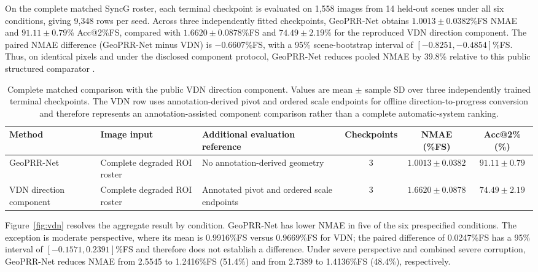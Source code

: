 \documentclass[electronics,article,submit,oneauthor]{Definitions/mdpi}
\newcommand{\modelname}{GeoPRR-Net\xspace}
\begin{document}
On the complete matched SyncG roster, each terminal checkpoint is evaluated on 1,558 images from 14 held-out scenes under all six conditions, giving 9,348 rows per seed. Across three independently fitted checkpoints, \modelname obtains $1.0013\pm0.0382$\%FS NMAE and $91.11\pm0.79$\% Acc@2\%FS, compared with $1.6620\pm0.0878$\%FS and $74.49\pm2.19$\% for the reproduced VDN direction component. The paired NMAE difference (\modelname minus VDN) is $-0.6607$\%FS, with a 95\% scene-bootstrap interval of $[-0.8251,-0.4854]$\%FS. Thus, on identical pixels and under the disclosed component protocol, \modelname reduces pooled NMAE by 39.8\% relative to this public structured comparator \cite{dong2021vdn}.

\begin{table}[H]
\caption{Complete matched comparison with the public VDN direction component. Values are mean $\pm$ sample SD over three independently trained terminal checkpoints. The VDN row uses annotation-derived pivot and ordered scale endpoints for offline direction-to-progress conversion and therefore represents an annotation-assisted component comparison rather than a complete automatic-system ranking.}
\label{tab:vdn}
\centering
\small
\begin{tabularx}{\textwidth}{@{}>{\raggedright\arraybackslash}p{}>{\raggedright\arraybackslash}p{}>{\raggedright\arraybackslash}Xccc@{}}
\toprule
\textbf{Method} & \textbf{Image input} & \textbf{Additional evaluation reference} & \textbf{Checkpoints} & \textbf{NMAE (\%FS)} & \textbf{Acc@2\% (\%)} \\
\midrule
\modelname & Complete degraded ROI roster & No annotation-derived geometry & 3 & $1.0013\pm0.0382$ & $91.11\pm0.79$ \\
VDN direction component & Complete degraded ROI roster & Annotated pivot and ordered scale endpoints & 3 & $1.6620\pm0.0878$ & $74.49\pm2.19$ \\
\bottomrule
\end{tabularx}
\end{table}

Figure~\ref{fig:vdn} resolves the aggregate result by condition. \modelname has lower NMAE in five of the six prespecified conditions. The exception is moderate perspective, where its mean is 0.9916\%FS versus 0.9669\%FS for VDN; the paired difference of 0.0247\%FS has a 95\% interval of $[-0.1571,0.2391]$\%FS and therefore does not establish a difference. Under severe perspective and combined severe corruption, \modelname reduces NMAE from 2.5545 to 1.2416\%FS (51.4\%) and from 2.7389 to 1.4136\%FS (48.4\%), respectively.
\end{document}
